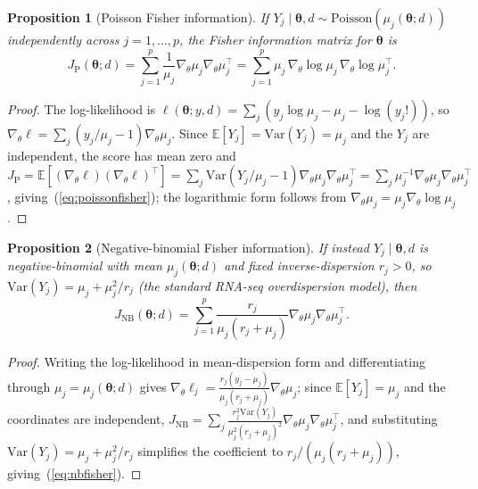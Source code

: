 \documentclass[11pt]{article}
\newtheorem{Proposition}{Proposition}
\begin{document}
\begin{Proposition}[Poisson Fisher information]
\label{prop:poissonfisher}
If $Y_j\mid\boldsymbol\theta,d\sim\mathrm{Poisson}(\mu_j(\boldsymbol\theta;d))$ independently across $j=1,\ldots,p$, the Fisher information matrix for $\boldsymbol\theta$ is
\begin{equation}
J_{\mathrm P}(\boldsymbol\theta;d)=\sum_{j=1}^p\frac{1}{\mu_j}\nabla_{\theta}\mu_j\nabla_{\theta}\mu_j^\top=\sum_{j=1}^p\mu_j\,\nabla_{\theta}\log\mu_j\,\nabla_{\theta}\log\mu_j^\top.
\label{eq:poissonfisher}
\end{equation}
\end{Proposition}
\begin{proof}
The log-likelihood is $\ell(\boldsymbol\theta;y,d)=\sum_j(y_j\log\mu_j-\mu_j-\log(y_j!))$, so $\nabla_\theta\ell=\sum_j(y_j/\mu_j-1)\nabla_\theta\mu_j$. Since $\mathbb{E}[Y_j]=\mathrm{Var}(Y_j)=\mu_j$ and the $Y_j$ are independent, the score has mean zero and $J_{\mathrm P}=\mathbb{E}[(\nabla_\theta\ell)(\nabla_\theta\ell)^\top]=\sum_j\mathrm{Var}(Y_j/\mu_j-1)\nabla_\theta\mu_j\nabla_\theta\mu_j^\top=\sum_j\mu_j^{-1}\nabla_\theta\mu_j\nabla_\theta\mu_j^\top$, giving~(\ref{eq:poissonfisher}); the logarithmic form follows from $\nabla_\theta\mu_j=\mu_j\nabla_\theta\log\mu_j$.
\end{proof}

\begin{Proposition}[Negative-binomial Fisher information]
\label{prop:nbfisher}
If instead $Y_j\mid\boldsymbol\theta,d$ is negative-binomial with mean $\mu_j(\boldsymbol\theta;d)$ and fixed inverse-dispersion $r_j>0$, so $\mathrm{Var}(Y_j)=\mu_j+\mu_j^2/r_j$ (the standard RNA-seq overdispersion model), then
\begin{equation}
J_{\mathrm{NB}}(\boldsymbol\theta;d)=\sum_{j=1}^p\frac{r_j}{\mu_j(r_j+\mu_j)}\nabla_{\theta}\mu_j\nabla_{\theta}\mu_j^\top.
\label{eq:nbfisher}
\end{equation}
\end{Proposition}
\begin{proof}
Writing the log-likelihood in mean-dispersion form and differentiating through $\mu_j=\mu_j(\boldsymbol\theta;d)$ gives $\nabla_\theta\ell_j=\frac{r_j(y_j-\mu_j)}{\mu_j(r_j+\mu_j)}\nabla_\theta\mu_j$; since $\mathbb{E}[Y_j]=\mu_j$ and the coordinates are independent, $J_{\mathrm{NB}}=\sum_j\frac{r_j^2\mathrm{Var}(Y_j)}{\mu_j^2(r_j+\mu_j)^2}\nabla_\theta\mu_j\nabla_\theta\mu_j^\top$, and substituting $\mathrm{Var}(Y_j)=\mu_j+\mu_j^2/r_j$ simplifies the coefficient to $r_j/(\mu_j(r_j+\mu_j))$, giving~(\ref{eq:nbfisher}).
\end{proof}
\end{document}
